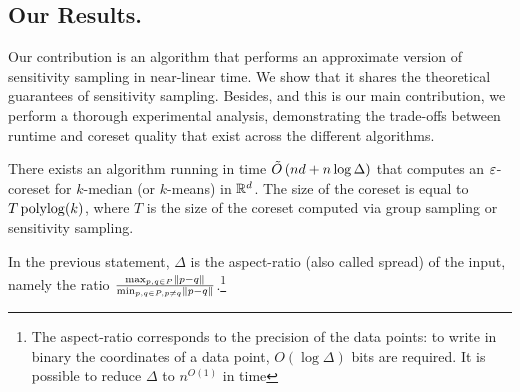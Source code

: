 %

\subsection{Our Results.}

Our contribution is an algorithm that performs an approximate version of sensitivity sampling in near-linear time. We show that it shares the theoretical
guarantees of sensitivity sampling. 
Besides, and this is our main contribution, we perform a thorough experimental analysis, demonstrating the trade-offs between runtime and coreset quality that exist
across the different algorithms.


\begin{theorem}\label{thm:main}
There exists an algorithm running in time $\tilde O\left( nd + n \log \Delta\right)$  that computes an $\varepsilon$-coreset for $k$-median (or $k$-means) in $\mathbb{R}^d$. The size of the coreset is equal to $T \operatorname{polylog}(k)$, where $T$ is the size of the coreset computed via group sampling or sensitivity sampling.
\end{theorem}
In the previous statement, $\Delta$ is the aspect-ratio (also called spread) of the input, namely the ratio $\frac{\max_{p, q \in P} \left\| p-q\right\|}{\min_{p, q \in P, p \neq q} \left\| p-q\right\|}$.\footnote{The aspect-ratio corresponds to the precision of the data points: to write in binary the coordinates of a data point, $O(\log \Delta)$ bits are required. It is possible to reduce $\Delta$ to $n^{O(1)}$ in time }

